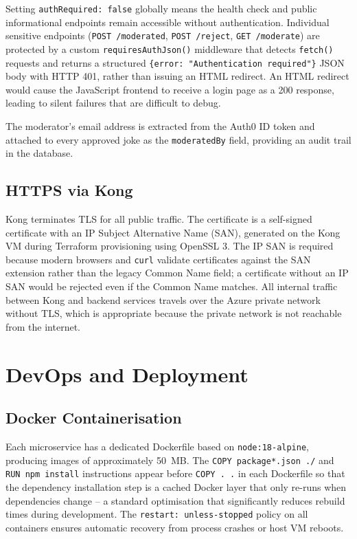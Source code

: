 \documentclass[12pt,a4paper]{article}
\begin{document}
Setting \texttt{authRequired: false} globally means the health check and public informational endpoints remain accessible without authentication. Individual sensitive endpoints (\texttt{POST /moderated}, \texttt{POST /reject}, \texttt{GET /moderate}) are protected by a custom \texttt{requiresAuthJson()} middleware that detects \texttt{fetch()} requests and returns a structured \texttt{\{error: "Authentication required"\}} JSON body with HTTP 401, rather than issuing an HTML redirect. An HTML redirect would cause the JavaScript frontend to receive a login page as a 200 response, leading to silent failures that are difficult to debug.

The moderator's email address is extracted from the Auth0 ID token and attached to every approved joke as the \texttt{moderatedBy} field, providing an audit trail in the database.

\subsection{HTTPS via Kong}

Kong terminates TLS for all public traffic. The certificate is a self-signed certificate with an IP Subject Alternative Name (SAN), generated on the Kong VM during Terraform provisioning using OpenSSL 3. The IP SAN is required because modern browsers and \texttt{curl} validate certificates against the SAN extension rather than the legacy Common Name field; a certificate without an IP SAN would be rejected even if the Common Name matches. All internal traffic between Kong and backend services travels over the Azure private network without TLS, which is appropriate because the private network is not reachable from the internet.

\section{DevOps and Deployment}

\subsection{Docker Containerisation}

Each microservice has a dedicated Dockerfile based on \texttt{node:18-alpine}, producing images of approximately 50~MB. The \texttt{COPY package*.json ./} and \texttt{RUN npm install} instructions appear before \texttt{COPY . .} in each Dockerfile so that the dependency installation step is a cached Docker layer that only re-runs when dependencies change -- a standard optimisation that significantly reduces rebuild times during development. The \texttt{restart: unless-stopped} policy on all containers ensures automatic recovery from process crashes or host VM reboots.
\end{document}
